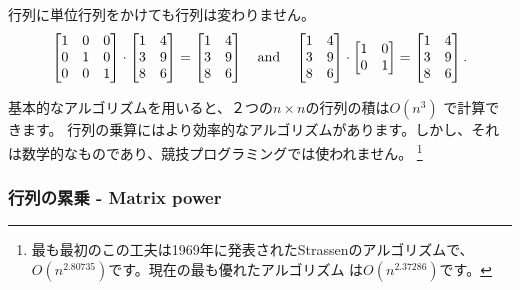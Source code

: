 \begin{samepage}
行列に単位行列をかけても行列は変わりません。
\[
 \begin{bmatrix}
  1 & 0 & 0 \\
  0 & 1 & 0 \\
  0 & 0 & 1 \\
 \end{bmatrix}
\cdot
 \begin{bmatrix}
  1 & 4 \\
  3 & 9 \\
  8 & 6 \\
 \end{bmatrix}
=
 \begin{bmatrix}
  1 & 4 \\
  3 & 9 \\
  8 & 6 \\
 \end{bmatrix} \hspace{10px} \textrm{and} \hspace{10px}
 \begin{bmatrix}
  1 & 4 \\
  3 & 9 \\
  8 & 6 \\
 \end{bmatrix}
\cdot
 \begin{bmatrix}
  1 & 0 \\
  0 & 1 \\
 \end{bmatrix}
=
 \begin{bmatrix}
  1 & 4 \\
  3 & 9 \\
  8 & 6 \\
 \end{bmatrix}.
\]
\end{samepage}

基本的なアルゴリズムを用いると、２つの$n \times n$の行列の積は$O(n^3)$ で計算できます。
行列の乗算にはより効率的なアルゴリズムがあります。しかし、それは数学的なものであり、競技プログラミングでは使われません。
\footnote{
最も最初のこの工夫は1969年に発表されたStrassenのアルゴリズム\cite{str69}で、
$O(n^{2.80735})$です。現在の最も優れたアルゴリズム \cite{gal14}は$O(n^{2.37286})$です。}

\subsubsection{行列の累乗 - Matrix power}


